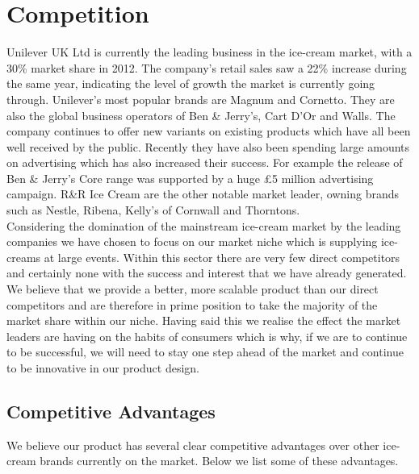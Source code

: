 \documentclass{article}
\begin{document}
\section{Competition}

  Unilever UK Ltd is currently the leading business in the ice-cream market, with a 30\% market share in 2012. The company's retail sales saw a 22\% increase during the same year, indicating the level of growth the market is currently going through. Unilever's most popular brands are Magnum and Cornetto. They are also the global business operators of Ben \& Jerry's, Cart D'Or and Walls. The company continues to offer new variants on existing products which have all been well received by the public. Recently they have also been spending large amounts on advertising which has also increased their success. For example the release of Ben \& Jerry's Core range was supported by a huge £5 million advertising campaign. R\&R Ice Cream are the other notable market leader, owning brands such as Nestle, Ribena, Kelly's of Cornwall and Thorntons. \\

  Considering the domination of the mainstream ice-cream market by the leading companies we have chosen to focus on our market niche which is supplying ice-creams at large events. Within this sector there are very few direct competitors and certainly none with the success and interest that we have already generated. We believe that we provide a better, more scalable product than our direct competitors and are therefore in prime position to take the majority of the market share within our niche. Having said this we realise the effect the market leaders are having on the habits of consumers which is why, if we are to continue to be successful, we will need to stay one step ahead of the market and continue to be innovative in our product design.

\subsection{Competitive Advantages}

  We believe our product has several clear competitive advantages over other ice-cream brands currently on the market. Below we list some of these advantages.
\end{document}
